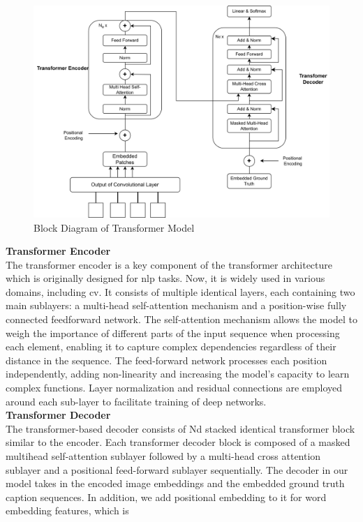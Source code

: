 \documentclass{ioereport}
\begin{document}
    \begin{figure}[H]
\includegraphics[scale=.7]{images/Transformer.png}
\caption{Block Diagram of Transformer Model}
\label{fig:transfor}
\end{figure}
\textbf{Transformer Encoder}\\
The transformer encoder is a key component of the transformer architecture which is
originally designed for \gls{nlp} tasks. Now, it is widely used in various domains, including
\gls{cv}. It consists of multiple identical layers, each containing two main sublayers: a multi-head self-attention mechanism and a position-wise fully connected feedforward network. The self-attention mechanism allows the model to weigh the
importance of different parts of the input sequence when processing each element,
enabling it to capture complex dependencies regardless of their distance in the
sequence. The feed-forward network processes each position independently, adding
non-linearity and increasing the model's capacity to learn complex functions. Layer
normalization and residual connections are employed around each sub-layer to facilitate
training of deep networks.\\
\textbf{Transformer Decoder}\\
The transformer-based decoder consists of Nd stacked identical transformer block
similar to the encoder. Each transformer decoder block is composed of a masked multihead self-attention sublayer followed by a multi-head cross attention sublayer and a
positional feed-forward sublayer sequentially. The decoder in our model takes in the
encoded image embeddings and the embedded ground truth caption sequences. In
addition, we add positional embedding to it for word embedding features, which is
\end{document}
